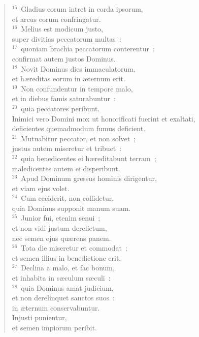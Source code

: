\begin{flushleft}
\begin{verse}
${}^{15}$~Gladius eorum intret in corda ipsorum,\\ et arcus eorum confringatur.\\
${}^{16}$~Melius est modicum justo,\\ super divitias peccatorum multas~:\\
${}^{17}$~quoniam brachia peccatorum conterentur~:\\ confirmat autem justos Dominus.\\
${}^{18}$~Novit Dominus dies immaculatorum,\\ et h\ae reditas eorum in \ae ternum erit.\\
${}^{19}$~Non confundentur in tempore malo,\\ et in diebus famis saturabuntur~:\\
${}^{20}$~quia peccatores peribunt.\\ Inimici vero Domini mox ut honorificati fuerint et exaltati,\\ deficientes quemadmodum fumus deficient.\\
${}^{21}$~Mutuabitur peccator, et non solvet~;\\ justus autem miseretur et tribuet~:\\
${}^{22}$~quia benedicentes ei h\ae reditabunt terram~;\\ maledicentes autem ei disperibunt.\\
${}^{23}$~Apud Dominum gressus hominis dirigentur,\\ et viam ejus volet.\\
${}^{24}$~Cum ceciderit, non collidetur,\\ quia Dominus supponit manum suam.\\
${}^{25}$~Junior fui, etenim senui~;\\ et non vidi justum derelictum,\\ nec semen ejus qu\ae rens panem.\\
${}^{26}$~Tota die miseretur et commodat~;\\ et semen illius in benedictione erit.\\
${}^{27}$~Declina a malo, et fac bonum,\\ et inhabita in s\ae culum s\ae culi~:\\
${}^{28}$~quia Dominus amat judicium,\\ et non derelinquet sanctos suos~:\\ in \ae ternum conservabuntur.\\ Injusti punientur,\\ et semen impiorum peribit.\\

\end{verse}
\end{flushleft}
